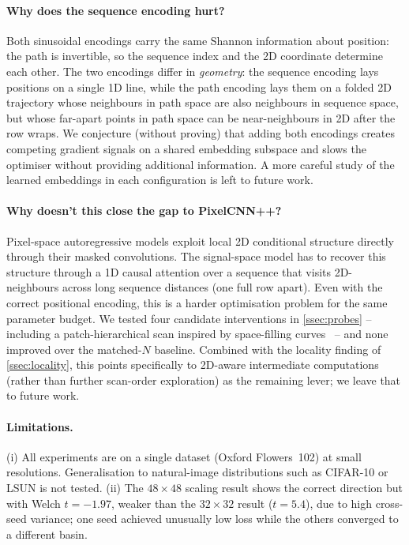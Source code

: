 \documentclass[conference,a4paper]{IEEEtran}
\begin{document}
\paragraph{Why does the sequence encoding hurt?}
Both sinusoidal encodings carry the same Shannon information about
position: the path is invertible, so the sequence index and the
2D coordinate determine each other. The two encodings differ in
\emph{geometry}: the sequence encoding lays positions on a single
1D line, while the path encoding lays them on a folded 2D
trajectory whose neighbours in path space are also neighbours in
sequence space, but whose far-apart points in path space can be
near-neighbours in 2D after the row wraps. We conjecture (without
proving) that adding both encodings creates competing gradient
signals on a shared embedding subspace and slows the optimiser
without providing additional information. A more careful study of
the learned embeddings in each configuration is left to future work.

\paragraph{Why doesn't this close the gap to PixelCNN++?}
Pixel-space autoregressive models exploit local 2D conditional
structure directly through their masked convolutions. The
signal-space model has to recover this structure through a
1D causal attention over a sequence that visits 2D-neighbours
across long sequence distances (one full row apart). Even with the
correct positional encoding, this is a harder optimisation problem
for the same parameter budget. We tested four candidate interventions in \cref{ssec:probes} --
including a patch-hierarchical scan inspired by space-filling
curves~\cite{li2025direction,li2025radar} -- and none improved
over the matched-$N$ baseline. Combined with the locality finding
of \cref{ssec:locality}, this points specifically to 2D-aware
intermediate computations (rather than further scan-order
exploration) as the remaining lever; we leave that to future work.

\paragraph{Limitations.}
(i) All experiments are on a single dataset (Oxford Flowers~102) at
small resolutions. Generalisation to natural-image distributions
such as CIFAR-10 or LSUN is not tested.
(ii) The $48\times48$ scaling result shows the correct direction
but with Welch $t=-1.97$, weaker than the $32\times32$ result
($t=5.4$), due to high cross-seed variance; one seed achieved
unusually low loss while the others converged to a different basin.
\end{document}
